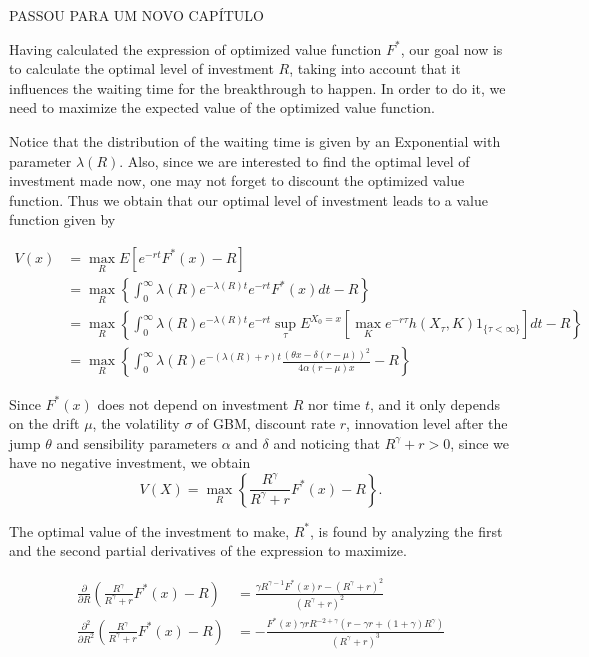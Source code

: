 PASSOU PARA UM NOVO CAPÍTULO

Having calculated the expression of optimized value function $F^*$, our goal now is to calculate the optimal level of investment $R$, taking into account that it influences the waiting time for the breakthrough to happen. In order to do it, we need to maximize the expected value of the optimized value function.

Notice that the distribution of the waiting time is given by an Exponential with parameter $\lambda(R)$. Also, since we are interested to find the optimal level of investment made now, one may not forget to discount the optimized value function.
Thus we obtain that our optimal level of investment leads to a value function given by 


\begin{align*}
V(x) &=\max_R E \left[ e^{-rt} F^*(x) -R \right]\\
& =  \max_R  \left\{ \int_0 ^\infty \lambda(R) e^{-\lambda(R)t} e^{-rt} F^*(x) dt -R \right\} \\
&= \max_R \left\{ \int_0 ^\infty \lambda(R) e^{-\lambda(R)t} e^{-rt} 
\sup_\tau E ^{X_0=x}\left[\max_K e^{-r\tau}h(X_\tau,K) 1_{\{\tau<\infty\}} \right]
dt -R \right\} \\
&= \max_R \left\{  \int_0 ^\infty \lambda(R) e^{-(\lambda(R)+r)t} \frac{(\theta x -\delta (r-\mu))^2}{4 \alpha (r-\mu) x} -R \right\}
\end{align*}




Since $F^*(x)$ does not depend on investment $R$ nor time $t$, and it only depends on the drift $\mu$, the volatility $\sigma$ of GBM, discount rate $r$, innovation level after the jump $\theta$ and sensibility parameters $\alpha$ and $\delta$ and noticing that $R^\gamma+r>0$, since we have no negative investment, we obtain
$$ V(X) =\max_R \left\{ \frac{R^\gamma}{R^\gamma+r} F^*(x) -R \right\}.$$

The optimal value of the investment to make, $R^*$, is found by analyzing the first and the second partial derivatives of the expression to maximize.

\begin{align*}
\frac{\partial}{\partial R} \left( \frac{R^\gamma}{R^\gamma+r} F^*(x) -R \right) &= \frac{\gamma R^{\gamma-1}F^*(x)r-(R^\gamma+r)^2}{(R^\gamma+r)^2}\\
\frac{\partial^2}{\partial R^2} \left( \frac{R^\gamma}{R^\gamma+r} F^*(x) -R \right) &=
-\frac{F^*(x) \gamma r R^{-2+\gamma}(r-\gamma r+(1+\gamma)R^\gamma)}{(R^\gamma+r)^3}
\end{align*}



